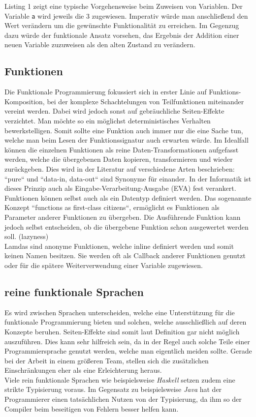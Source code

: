 \documentclass[10pt,journal,compsoc]{IEEEtran}
\begin{document}
Listing 1 zeigt eine typische Vorgehensweise beim Zuweisen von Variablen. Der Variable \texttt{a} wird jeweils die 3 zugewiesen. Imperativ würde man anschließend den Wert verändern um die gewünschte Funktionalität zu erreichen. Im Gegenzug dazu würde der funktionale Ansatz vorsehen, das Ergebnis der Addition einer neuen Variable zuzuweisen als den alten Zustand zu verändern.
\subsection{Funktionen}
Die Funktionale Programmierung fokussiert sich in erster Linie auf Funktions-Komposition, bei der komplexe Schachtelungen von Teilfunktionen miteinander vereint werden. Dabei wird jedoch sonst auf gebräuchliche Seiten-Effekte verzichtet. Man möchte so ein möglichst deterministisches Verhalten bewerkstelligen. Somit sollte eine Funktion auch immer nur die eine Sache tun, welche man beim Lesen der Funktionssignatur auch erwarten würde. Im Idealfall können die einzelnen Funktionen als reine Daten-Transformationen aufgefasst werden, welche die übergebenen Daten kopieren, transformieren und wieder zurückgeben. Dies wird in der Literatur auf verschiedene Arten beschrieben: ``pure`` und ``data-in, data-out`` sind Synonyme für einander. In der Informatik ist dieses Prinzip auch als Eingabe-Verarbeitung-Ausgabe (EVA) fest verankert. \\
Funktionen können selbst auch als ein Datentyp definiert werden. Das sogenannte Konzept ``functions as first-class citizens``, ermöglicht es Funktionen als Parameter anderer Funktionen zu übergeben. Die Ausführende Funktion kann jedoch selbst entscheiden, ob die übergebene Funktion schon ausgewertet werden soll. (lazyness)\\
Lamdas sind anonyme Funktionen, welche inline definiert werden und somit keinen Namen besitzen. Sie werden oft als Callback anderer Funktionen genutzt oder für die spätere Weiterverwendung einer Variable zugewiesen.

\subsection{reine funktionale Sprachen}
Es wird zwischen Sprachen unterscheiden, welche eine Unterstützung für die funktionale Programmierung bieten und solchen, welche ausschließlich auf deren Konzepte beruhen.
Seiten-Effekte sind somit laut Definition gar nicht möglich auszuführen. Dies kann sehr hilfreich sein, da in der Regel auch solche Teile einer Programmiersprache genutzt werden, welche man eigentlich meiden sollte. Gerade bei der Arbeit in einem größeren Team, stellen sich die zusätzlichen Einschränkungen eher als eine Erleichterung heraus.\\
Viele rein funktionale Sprachen wie beispielsweise \textit{Haskell} setzen zudem eine strikte Typisierung voraus. Im Gegensatz zu beispielsweise \textit{Java} hat der Programmierer einen tatsächlichen Nutzen von der Typisierung, da ihm so der Compiler beim beseitigen von Fehlern besser helfen kann.
\end{document}
